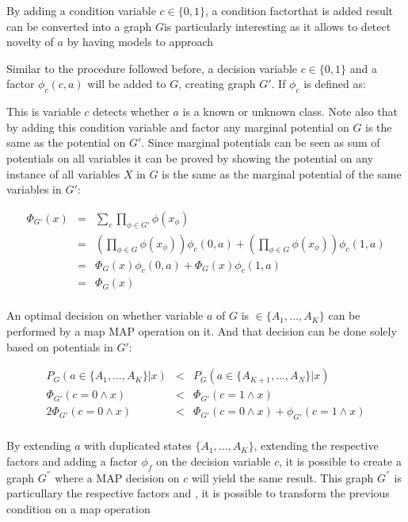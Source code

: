 By adding a condition variable $c \in \{0, 1\}$, a condition factorthat is added result can be converted into a graph $G$is particularly interesting as it allows to detect novelty of $a$ by
having models to approach 

Similar to the procedure followed before, a decision variable $c \in \{0, 1\}$
and a factor $\phi_c(c,a)$ will be added to $G$, creating graph $G'$.
If $\phi_c$ is defined as:


This is variable $c$ detects whether $a$ is a known or unknown class.
Note also that by adding this condition variable and factor any marginal
potential on $G$ is the same as the potential on $G'$. Since marginal potentials
can be seen as sum of potentials on all variables it can be proved by showing
the potential on any instance of all variables $X$ in $G$ is the same as the
marginal potential of the same variables in $G'$:

\begin{eqnarray*}
\Phi_{G'}(x) &=& \sum_{c}\prod_{\phi \in G'}{\phi(x_\phi)} \\
             &=& \left(\prod_{\phi \in G}{\phi(x_\phi)}\right)\phi_c(0,a) 
               + \left(\prod_{\phi \in G}{\phi(x_\phi)}\right)\phi_c(1,a)\\
             &=& \Phi_G(x)\phi_c(0,a) + \Phi_G(x)\phi_c(1,a)\\
             &=& \Phi_G(x)\\
\end{eqnarray*}

An optimal decision on whether variable $a$ of $G$ is $\in \{A_1,\dotsc,A_K\}$
can be performed by a map \gls{MAP} operation on it. And that decision can be
done solely based on potentials in $G'$:

\begin{eqnarray*}
P_G(a \in \{A_1,\dotsc,A_K\}|x) &<& P_G(a \in \{A_{K+1},\dotsc,A_N\}|x) \\
\Phi_{G'}(c = 0 \land x) &<& \Phi_{G'}(c = 1 \land x) \\
2 \Phi_{G'}(c = 0 \land x) &<& \Phi_{G'}(c=0 \land x) + \phi_{G'}(c = 1 \land x)\\
\end{eqnarray*}


By extending $a$ with duplicated states $\{A_1, \dotsc, A_K\}$, extending
the respective factors and adding a factor $\phi_f$ on the decision
variable $c$, it is possible to create a graph $G^{''}$ where a MAP decision on
$c$ will yield the same result. This graph $G^{''}$ is particullary 
the respective factors and , it is possible
to transform the previous condition on a map operation 

